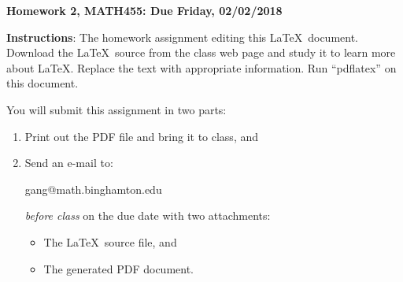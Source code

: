 \documentclass[11pt]{article}
\begin{document}
\begin{title}
	{\Large\bf Homework 2, MATH455: Due Friday, 02/02/2018}
\end{title}

\author{\bf Alexander Van Roijen}

\maketitle
{\bf Instructions}:  The homework assignment editing this \LaTeX\ document.  Download the \LaTeX\ source from the class web page and study
it to learn more about \LaTeX.  Replace the text with appropriate information.  Run ``pdflatex'' on this document.

You will submit this assignment in two parts:
\begin{enumerate}
\item Print out the PDF file and bring it to class, and
\item Send an e-mail to:
\begin{center}
gang@math.binghamton.edu
\end{center}
\emph{before class} on the due date with two attachments:
\begin{itemize}
\item The \LaTeX\ source file, and
\item The generated PDF document.
\end{itemize}
\end{enumerate}
\end{document}
